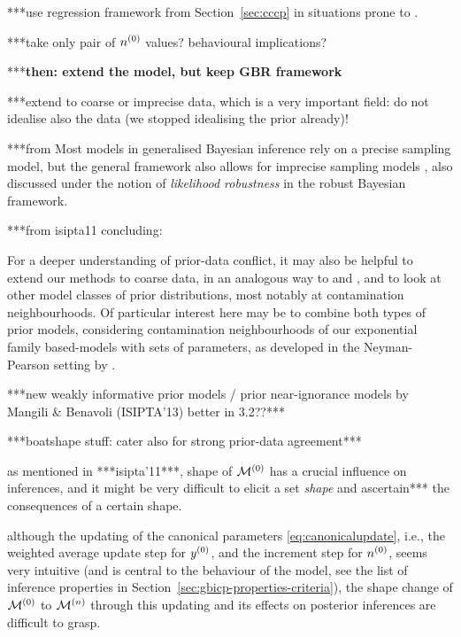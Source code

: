 ***use regression framework from Section~\ref{sec:cccp} in situations prone to \pdc.

***take only pair of $n^{(0)}$ values? behavioural implications?


***\textbf{then: extend the model, but keep GBR framework}

***extend to coarse or imprecise data, which is a very important field:
do not idealise also the data (we stopped idealising the prior already)!

***from \textcite[4.4]{itip-statinf}
Most models in generalised Bayesian inference rely on a precise sampling model,
but the general framework also allows for imprecise sampling models \parencite[see, in particular,][\S 8.5]{1991:walley},
also discussed under the notion of \emph{likelihood robustness} \parencite[e.g.,][]{2000:shyamalkumar} in the robust Bayesian framework.


***from isipta11 concluding:
\begin{small}
For a deeper understanding of prior-data conflict, it may also be helpful
to extend our methods to coarse data, in an analogous way to \textcite{2007:utkinaugustin} and
\textcite{2009:Troffaes:Coolen}, and to look at other model classes of prior distributions, most
notably at contamination neighbourhoods. Of particular interest here may
be to combine both types of prior models, considering contamination
neighbourhoods of our exponential family based-models with sets of
parameters, as developed in the Neyman-Pearson setting by
\textcite[\S~5]{2002:augustin}.
\end{small}

***new weakly informative prior models / prior near-ignorance models by Mangili \& Benavoli (ISIPTA'13) better in 3.2??***


***boatshape stuff: cater also for strong prior-data agreement***

as mentioned in ***isipta'11***, shape of $\mathcal{M}^{(0)}$ has a crucial influence on inferences,
and it might be very difficult to elicit a set \emph{shape} and ascertain*** the consequences of a certain shape.

although the updating of the canonical parameters \eqref{eq:canonicalupdate},
i.e., the weighted average update step for $y^{(0)}$, and the increment step for $n^{(0)}$,
seems very intuitive (and is central to the behaviour of the model,
see the list of inference properties in Section~\ref{sec:gbicp-properties-criteria}),
the shape change of $\mathcal{M}^{(0)}$ to $\mathcal{M}^{(n)}$ through this updating and its effects on posterior inferences are difficult to grasp.

